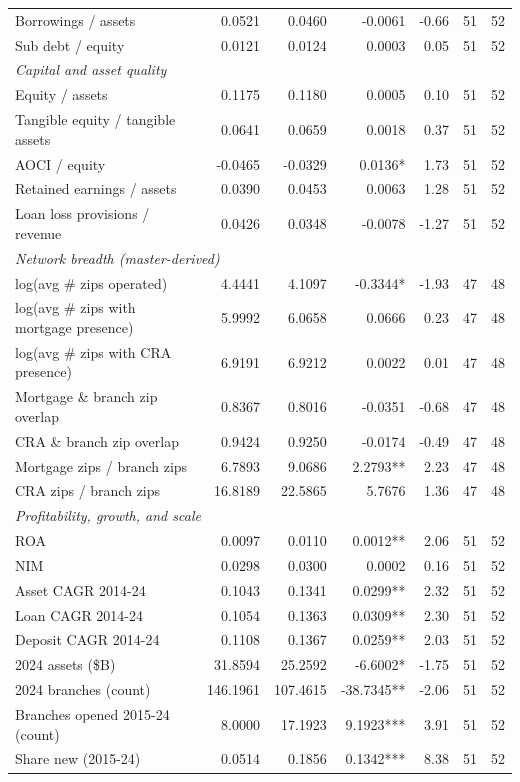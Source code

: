 \begin{tabular}{lrrrrrr}
Borrowings / assets & 0.0521 & 0.0460 & -0.0061 & -0.66 & 51 & 52 \\
Sub debt / equity & 0.0121 & 0.0124 & 0.0003 & 0.05 & 51 & 52 \\
\midrule
\multicolumn{7}{l}{\emph{Capital and asset quality}} \\
\midrule
Equity / assets & 0.1175 & 0.1180 & 0.0005 & 0.10 & 51 & 52 \\
Tangible equity / tangible assets & 0.0641 & 0.0659 & 0.0018 & 0.37 & 51 & 52 \\
AOCI / equity & -0.0465 & -0.0329 & 0.0136* & 1.73 & 51 & 52 \\
Retained earnings / assets & 0.0390 & 0.0453 & 0.0063 & 1.28 & 51 & 52 \\
Loan loss provisions / revenue & 0.0426 & 0.0348 & -0.0078 & -1.27 & 51 & 52 \\
\midrule
\multicolumn{7}{l}{\emph{Network breadth (master-derived)}} \\
\midrule
log(avg \# zips operated) & 4.4441 & 4.1097 & -0.3344* & -1.93 & 47 & 48 \\
log(avg \# zips with mortgage presence) & 5.9992 & 6.0658 & 0.0666 & 0.23 & 47 & 48 \\
log(avg \# zips with CRA presence) & 6.9191 & 6.9212 & 0.0022 & 0.01 & 47 & 48 \\
Mortgage \& branch zip overlap & 0.8367 & 0.8016 & -0.0351 & -0.68 & 47 & 48 \\
CRA \& branch zip overlap & 0.9424 & 0.9250 & -0.0174 & -0.49 & 47 & 48 \\
Mortgage zips / branch zips & 6.7893 & 9.0686 & 2.2793** & 2.23 & 47 & 48 \\
CRA zips / branch zips & 16.8189 & 22.5865 & 5.7676 & 1.36 & 47 & 48 \\
\midrule
\multicolumn{7}{l}{\emph{Profitability, growth, and scale}} \\
\midrule
ROA & 0.0097 & 0.0110 & 0.0012** & 2.06 & 51 & 52 \\
NIM & 0.0298 & 0.0300 & 0.0002 & 0.16 & 51 & 52 \\
Asset CAGR 2014-24 & 0.1043 & 0.1341 & 0.0299** & 2.32 & 51 & 52 \\
Loan CAGR 2014-24 & 0.1054 & 0.1363 & 0.0309** & 2.30 & 51 & 52 \\
Deposit CAGR 2014-24 & 0.1108 & 0.1367 & 0.0259** & 2.03 & 51 & 52 \\
2024 assets (\$B) & 31.8594 & 25.2592 & -6.6002* & -1.75 & 51 & 52 \\
2024 branches (count) & 146.1961 & 107.4615 & -38.7345** & -2.06 & 51 & 52 \\
Branches opened 2015-24 (count) & 8.0000 & 17.1923 & 9.1923*** & 3.91 & 51 & 52 \\
Share new (2015-24) & 0.0514 & 0.1856 & 0.1342*** & 8.38 & 51 & 52 \\
\bottomrule
\end{tabular}

